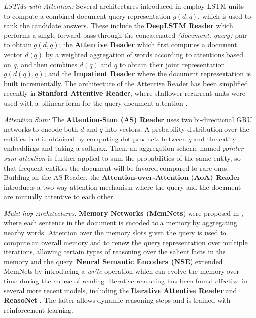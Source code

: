 \documentclass[11pt,a4paper]{article}
\begin{document}
\textit{LSTMs with Attention:} Several architectures introduced in \citet{hermann2015teaching}
employ LSTM units to compute a combined document-query representation $g(d,q)$,
which is used to rank the candidate answers.
These include the \textbf{DeepLSTM Reader} which performs a single forward pass through the concatenated \textit{(document, query)} pair to obtain $g(d,q)$;
the \textbf{Attentive Reader} which first computes a document vector $d(q)$ by a weighted aggregation of words according to attentions based on $q$, and then combines $d(q)$ and $q$ to obtain their joint representation $g(d(q),q)$;
and the \textbf{Impatient Reader} where the document representation is built incrementally.
The architecture of the Attentive Reader has been simplified recently in \textbf{Stanford Attentive Reader},
where shallower recurrent units were used with a bilinear form for the query-document attention \citep{chen2016thorough}.

\textit{Attention Sum:} The \textbf{Attention-Sum (AS) Reader}
\citep{kadlec2016text} uses two bi-directional GRU networks \citep{cho2014learning} to encode both $d$ and $q$ into vectors.
A probability distribution over the entities in $d$
is obtained by computing dot products between $q$ and the entity embeddings and taking a softmax. 
Then, an aggregation scheme named \emph{pointer-sum attention}
is further applied to sum the probabilities of the same entity,
so that frequent entities the document will be favored
compared to rare ones. 
Building on the AS Reader,
the \textbf{Attention-over-Attention (AoA) Reader} \citep{cui2016attention} 
introduces a two-way attention mechanism where the query and the document are mutually attentive to each other.

\textit{Mulit-hop Architectures:} \textbf{Memory Networks (MemNets}) were proposed in \citet{weston2014memory},
where each sentence in the document is encoded to a memory by aggregating nearby words. 
Attention over the memory slots given the query is used to compute an overall memory and to renew the query representation over multiple iterations, allowing certain types of reasoning over the salient facts in the memory and the query. 
\textbf{Neural Semantic Encoders (NSE)} \citep{munkhdalai2016neural} extended MemNets by introducing a \textit{write} operation which can evolve the memory over time during the course of reading.
Iterative reasoning has been found effective in several more recent models,
including the \textbf{Iterative Attentive Reader} \citep{sordoni2016iterative} and \textbf{ReasoNet} \citep{shen2016reasonet}.
The latter allows dynamic reasoning steps
and is trained with reinforcement learning. 
\end{document}
